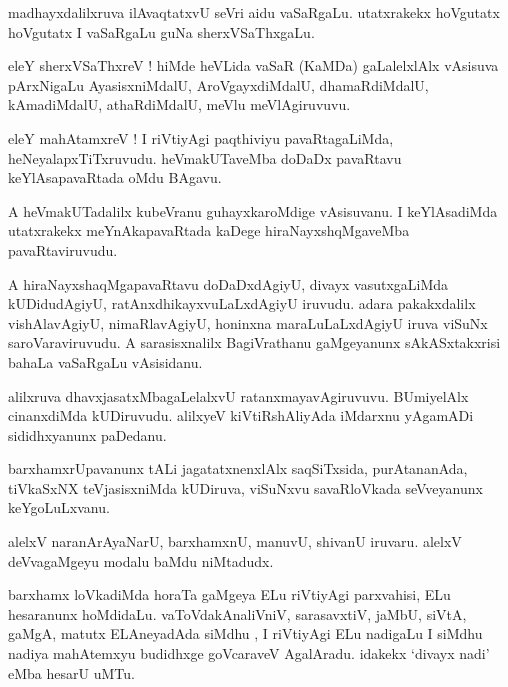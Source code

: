 \documentclass{article}
\begin{document}
\begin{mn}
madhayxdalilxruva ilAvaqtatxvU seVri aidu vaSaRgaLu.
utatxrakekx hoVgutatx hoVgutatx I vaSaRgaLu guNa sherxVSaThxgaLu.
\end{mn}

\begin{mn}
eleY sherxVSaThxreV ! hiMde heVLida vaSaR (KaMDa) gaLalelxlAlx vAsisuva pArxNigaLu AyasisxniMdalU,
AroVgayxdiMdalU, dhamaRdiMdalU, kAmadiMdalU, athaRdiMdalU, meVlu meVlAgiruvuvu.
\end{mn}

\begin{mn}
eleY mahAtamxreV ! I riVtiyAgi paqthiviyu pavaRtagaLiMda, heNeyalapxTiTxruvudu. 
heVmakUTaveMba doDaDx pavaRtavu keYlAsapavaRtada oMdu BAgavu.
\end{mn}

\begin{mn}
A heVmakUTadalilx kubeVranu guhayxkaroMdige vAsisuvanu. I keYlAsadiMda 
utatxrakekx meYnAkapavaRtada 
kaDege hiraNayxshqMgaveMba pavaRtaviruvudu.
\end{mn}

\begin{mn}
A hiraNayxshaqMgapavaRtavu doDaDxdAgiyU, divayx vasutxgaLiMda kUDidudAgiyU,
ratAnxdhikayxvuLaLxdAgiyU iruvudu. adara pakakxdalilx vishAlavAgiyU, nimaRlavAgiyU,
honinxna maraLuLaLxdAgiyU iruva viSuNx saroVaraviruvudu.
A sarasisxnalilx BagiVrathanu gaMgeyanunx sAkASxtakxrisi bahaLa vaSaRgaLu vAsisidanu.
\end{mn}

\begin{mn}
alilxruva dhavxjasatxMbagaLelalxvU ratanxmayavAgiruvuvu.
BUmiyelAlx cinanxdiMda kUDiruvudu. alilxyeV kiVtiRshAliyAda 
iMdarxnu yAgamADi sididhxyanunx paDedanu.
\end{mn}

\begin{mn}
barxhamxrUpavanunx tALi jagatatxnenxlAlx saqSiTxsida, purAtananAda,  
tiVkaSxNX teVjasisxniMda kUDiruva,
viSuNxvu savaRloVkada seVveyanunx keYgoLuLxvanu.
\end{mn}

\begin{mn}
alelxV naranArAyaNarU, barxhamxnU, manuvU, shivanU iruvaru. 
alelxV deVvagaMgeyu modalu baMdu niMtadudx.
\end{mn}

\begin{mn}
barxhamx loVkadiMda horaTa gaMgeya ELu riVtiyAgi parxvahisi, ELu hesaranunx hoMdidaLu. 
vaToVdakAnaliVniV, sarasavxtiV, jaMbU, siVtA, gaMgA, matutx ELAneyadAda siMdhu , I riVtiyAgi ELu 
nadigaLu I siMdhu nadiya mahAtemxyu budidhxge 
goVcaraveV AgalAradu. idakekx `divayx nadi' eMba hesarU uMTu.
\end{mn}
\end{document}
